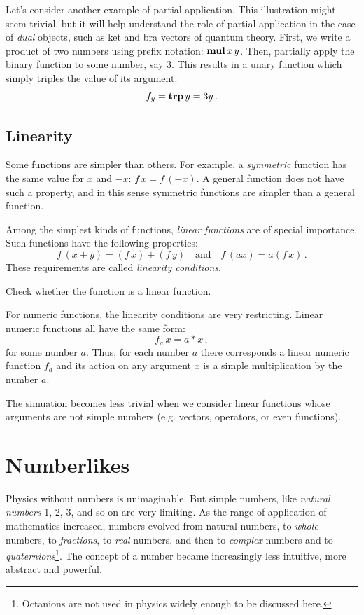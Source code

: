 Let's consider another example of partial application. This illustration might seem trivial, but it will help understand the role of partial application in the case of \emph{dual} objects, such as ket and bra vectors of quantum theory. First, we write a product of two numbers using prefix notation: $\textrm{\bf {mul}}\,x\,y$. Then, partially apply the binary function  to some number, say $3$. This results in a unary function  which simply triples the value of its argument:
\[
f_y = \textrm{\bf {trp}}\,y=3y\,.
\] 

\subsection{Linearity}\label{subsec:linearity}
Some functions are simpler than others. For example, a \emph{symmetric} function has the same value for $x$ and $-x$: $f\,x=f\,(-x)$. A general function does not have such a property, and in this sense symmetric functions are simpler than a general function.

Among the simplest kinds of functions, \emph{linear functions} are of special importance. Such functions have the following properties:
\[
f\,(x+y) = (f\, x)+(f\,y)\quad\textrm{and}\quad f\,(ax)=a(f\, x)\,.
\]
These requirements are called \emph{linearity conditions}.

\begin{exercise}
	Check whether the function  is a linear function.
\end{exercise}

For numeric functions, the linearity conditions are very restricting. Linear numeric functions all have the same form:
\[
f_a\,x=a*x\,,
\]
for some number $a$. Thus, for each number $a$ there corresponds a linear numeric function $f_a$ and its action on any argument $x$ is a simple multiplication by the number $a$.

The simuation becomes less trivial when we consider linear functions whose arguments are not simple numbers (e.g. vectors, operators, or even functions).


\section{Numberlikes}\label{sec:Numberlikes}
Physics without numbers is unimaginable. But simple numbers, like \emph{natural numbers} 1, 2, 3, and so on are very limiting.  As the range of application of mathematics increased, numbers evolved from natural numbers, to \emph{whole} numbers, to \emph{fractions}, to \emph{real} numbers, and then to \emph{complex} numbers and to \emph{quaternions}\footnote{Octanions are not used in physics widely enough to be discussed here.}. The concept of a number became increasingly less intuitive, more abstract and powerful.

